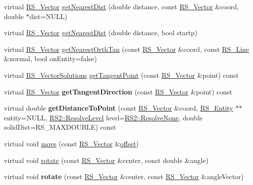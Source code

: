 \begin{DoxyCompactItemize}
\item 
virtual \hyperlink{classRS__Vector}{R\-S\-\_\-\-Vector} \hyperlink{classRS__Arc_a277875743bf751c466b0a8cde646cf88}{get\-Nearest\-Dist} (double distance, const \hyperlink{classRS__Vector}{R\-S\-\_\-\-Vector} \&coord, double $\ast$dist=N\-U\-L\-L)
\item 
virtual \hyperlink{classRS__Vector}{R\-S\-\_\-\-Vector} \hyperlink{classRS__Arc_ae14f521d2bad8f333928b4000e05ff8a}{get\-Nearest\-Dist} (double distance, bool startp)
\item 
virtual \hyperlink{classRS__Vector}{R\-S\-\_\-\-Vector} \hyperlink{classRS__Arc_ad6964b9fbf2d24930a8a448c724ea37c}{get\-Nearest\-Orth\-Tan} (const \hyperlink{classRS__Vector}{R\-S\-\_\-\-Vector} \&coord, const \hyperlink{classRS__Line}{R\-S\-\_\-\-Line} \&normal, bool on\-Entity=false)
\item 
virtual \hyperlink{classRS__VectorSolutions}{R\-S\-\_\-\-Vector\-Solutions} \hyperlink{classRS__Arc_a2329fe3d87a2eaf68ee44dfbcf92702c}{get\-Tangent\-Point} (const \hyperlink{classRS__Vector}{R\-S\-\_\-\-Vector} \&point) const 
\item 
\hypertarget{classRS__Arc_a865f6c272450348e624adda67a87fc72}{virtual \hyperlink{classRS__Vector}{R\-S\-\_\-\-Vector} {\bfseries get\-Tangent\-Direction} (const \hyperlink{classRS__Vector}{R\-S\-\_\-\-Vector} \&point) const }\label{classRS__Arc_a865f6c272450348e624adda67a87fc72}

\item 
\hypertarget{classRS__Arc_a9af0616f1d8c50c55da25fdb54a7e352}{virtual double {\bfseries get\-Distance\-To\-Point} (const \hyperlink{classRS__Vector}{R\-S\-\_\-\-Vector} \&coord, \hyperlink{classRS__Entity}{R\-S\-\_\-\-Entity} $\ast$$\ast$entity=N\-U\-L\-L, \hyperlink{classRS2_a1b2c5e3a3e9d1b03a9564229255faa20}{R\-S2\-::\-Resolve\-Level} level=\hyperlink{classRS2_a1b2c5e3a3e9d1b03a9564229255faa20aecb7396f39bc313ad8903c8a5fac5a50}{R\-S2\-::\-Resolve\-None}, double solid\-Dist=R\-S\-\_\-\-M\-A\-X\-D\-O\-U\-B\-L\-E) const }\label{classRS__Arc_a9af0616f1d8c50c55da25fdb54a7e352}

\item 
virtual void \hyperlink{classRS__Arc_a2f3c13ace5cfa5c09de715311218968d}{move} (const \hyperlink{classRS__Vector}{R\-S\-\_\-\-Vector} \&\hyperlink{classRS__Arc_aa7da3f3ea0ece264776e3f7cb25e669e}{offset})
\item 
virtual void \hyperlink{classRS__Arc_ac2c84a5793e760e260b7a365ba7bd8a6}{rotate} (const \hyperlink{classRS__Vector}{R\-S\-\_\-\-Vector} \&center, const double \&angle)
\item 
\hypertarget{classRS__Arc_a41e0c5f16bb8335540cf85d3c1dea1ab}{virtual void {\bfseries rotate} (const \hyperlink{classRS__Vector}{R\-S\-\_\-\-Vector} \&center, const \hyperlink{classRS__Vector}{R\-S\-\_\-\-Vector} \&angle\-Vector)}\label{classRS__Arc_a41e0c5f16bb8335540cf85d3c1dea1ab}


\end{DoxyCompactItemize}
